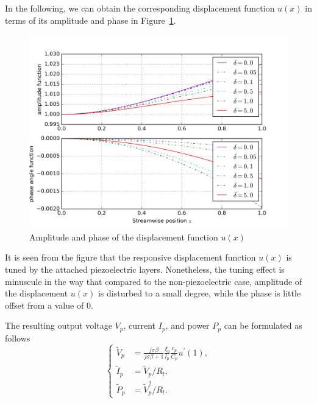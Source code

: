 \documentclass{article}
\begin{document}
In the following, we can obtain the corresponding displacement function $u(x)$ in terms of its amplitude and phase in Figure~\ref{fig:fig_sol_analytic_disp_fun}. 

\begin{figure}[!htbp]
    \centering
    \includegraphics[width=\textwidth]{./img_eig_asy/fig_sol_analytic_disp_fun.jpg}
    \caption{Amplitude and phase of the displacement function $u(x)$}
    \label{fig:fig_sol_analytic_disp_fun}
\end{figure}

It is seen from the figure that the responsive displacement function $u(x)$ is tuned by the attached piezoelectric layers. Nonetheless, the tuning effect is minuscule in the way that compared to the non-piezoelectric case, amplitude of the displacement $u(x)$ is disturbed to a small degree, while the phase is little offset from a value of $0$. 



















\newpage
The resulting output voltage $V_p$, current $I_p$, and power $P_p$ can be formulated as follows
\begin{equation}
    \left\{\begin{aligned}
        \tilde{V}_p &= \frac{j \sigma \beta}{j \sigma \beta + 1} \frac{\xi_b}{l_p} \frac{e_p}{C_p} u^\prime(1), \\
        \tilde{I}_p &=  \tilde{V}_p / R_l, \\
        \tilde{P}_p &=  \tilde{V}_p^2 / R_l.
    \end{aligned}\right.
\end{equation}
\end{document}

